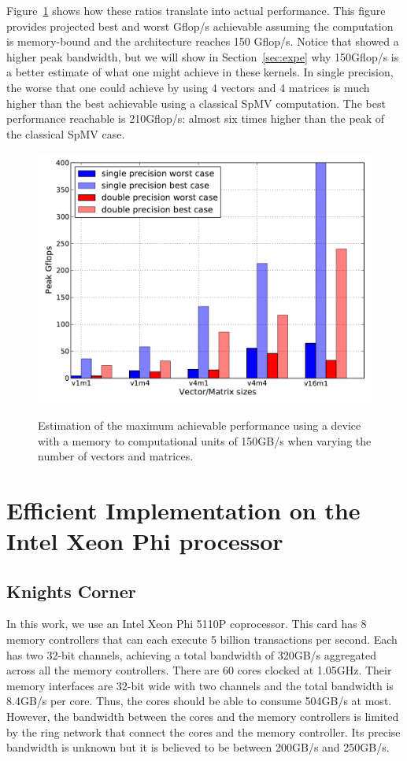 \documentclass[10pt,conference,compsocconf]{IEEEtran}
\begin{document}
Figure~\ref{fig:perf_predict} shows how these ratios translate
into actual performance. This figure provides projected best and worst
Gflop/s achievable assuming the computation is memory-bound and the
architecture reaches 150 Gflop/s. Notice that \cite{Saule13-ARXIV}
showed a higher peak bandwidth, but we will show in
Section~\ref{sec:expe} why 150Gflop/s is a better estimate of what one
might achieve in these kernels. In single precision, the worse that
one could achieve by using 4 vectors and 4 matrices is much higher
than the best achievable using a classical SpMV computation. The best
performance reachable is 210Gflop/s: almost six times higher than the
peak of the classical SpMV case. 


\begin{figure}
  \centering 
  \includegraphics[width=.9\linewidth]{figures/gflops_peak.pdf}\label{fig:gflops-peak-perf}
  \caption{Estimation of the maximum achievable performance using a
    device with a memory to computational units of 150GB/s when
    varying the number of vectors and matrices.}
  \label{fig:perf_predict}
\end{figure}

\section{Efficient Implementation on the Intel Xeon Phi processor}
\label{sec:impl}

\subsection{Knights Corner}

In this work, we use an Intel Xeon Phi 5110P coprocessor. This card
has 8 memory controllers that can each execute 5 billion
transactions per second. Each has two 32-bit channels, achieving a total
bandwidth of 320GB/s aggregated across all the memory
controllers. There are 60 cores clocked at 1.05GHz. Their memory
interfaces are 32-bit wide with two channels and the total bandwidth
is 8.4GB/s per core. Thus, the cores should be able to consume 504GB/s
at most. However, the bandwidth between the cores and the memory
controllers is limited by the ring network that connect the cores and
the memory controller. Its precise bandwidth is unknown but it is
believed to be between 200GB/s and 250GB/s.
\end{document}
